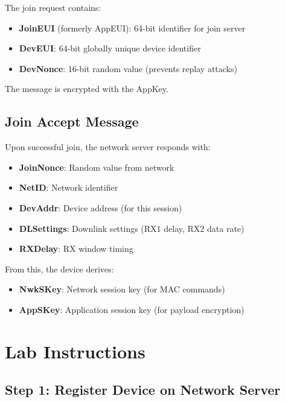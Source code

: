 \documentclass[11pt,a4paper]{article}
\begin{document}
The join request contains:
\begin{itemize}
    \item \textbf{JoinEUI} (formerly AppEUI): 64-bit identifier for join server
    \item \textbf{DevEUI}: 64-bit globally unique device identifier
    \item \textbf{DevNonce}: 16-bit random value (prevents replay attacks)
\end{itemize}

The message is encrypted with the AppKey.

\subsection{Join Accept Message}

Upon successful join, the network server responds with:
\begin{itemize}
    \item \textbf{JoinNonce}: Random value from network
    \item \textbf{NetID}: Network identifier
    \item \textbf{DevAddr}: Device address (for this session)
    \item \textbf{DLSettings}: Downlink settings (RX1 delay, RX2 data rate)
    \item \textbf{RXDelay}: RX window timing
\end{itemize}

From this, the device derives:
\begin{itemize}
    \item \textbf{NwkSKey}: Network session key (for MAC commands)
    \item \textbf{AppSKey}: Application session key (for payload encryption)
\end{itemize}

\section{Lab Instructions}

\subsection{Step 1: Register Device on Network Server}
\end{document}
